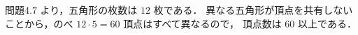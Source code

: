 \subsection{}
問題4.7 より，五角形の枚数は $12$ 枚である．
異なる五角形が頂点を共有しないことから，のべ $12\cdot 5 = 60$ 頂点はすべて異なるので，
頂点数は $60$ 以上である．